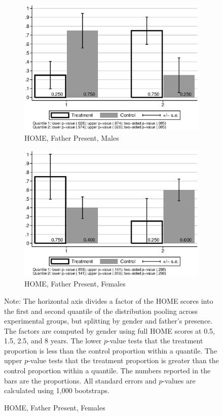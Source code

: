 \begin{figure}
\begin{center}
	\begin{subfigure}[b]{0.49\textwidth}
		\centering
		\caption{HOME, Father Present, Males}
		\label{fig:home-male-factor}
			\includegraphics[width=\textwidth]{../output/HOME-male1-fhome1-2quant}
	\end{subfigure}
	\begin{subfigure}[b]{0.49\textwidth}
		\centering
		\caption{HOME, Father Present, Females}
		\label{fig:home-female-factor}
			\includegraphics[width=\textwidth]{../output/HOME-male0-fhome1-2quant}
	\end{subfigure}
\end{center}
\raggedright \footnotesize
Note: The horizontal axis divides a factor of the HOME scores into the first and second quantile of the distribution pooling across experimental groups, but splitting  by gender and father's presence. The factors are computed by gender using full HOME scores at 0.5, 1.5, 2.5, and 8 years. The lower $p$-value tests that the treatment proportion is less than the control proportion within a quantile. The upper $p$-value tests that the treatment proportion is greater than the control proportion within a quantile. The numbers reported in the bars are the proportions. All standard errors and $p$-values are calculated using 1,000 bootstraps.
\end{figure}

